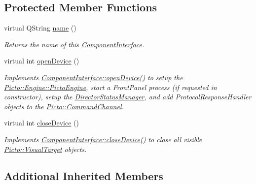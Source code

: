 \subsection*{Protected Member Functions}
\begin{DoxyCompactItemize}
\item 
\hypertarget{class_director_a757af6de79d8409b98d3d29db654ebf1}{virtual Q\-String \hyperlink{class_director_a757af6de79d8409b98d3d29db654ebf1}{name} ()}\label{class_director_a757af6de79d8409b98d3d29db654ebf1}

\begin{DoxyCompactList}\small\item\em Returns the name of this \hyperlink{class_component_interface}{Component\-Interface}. \end{DoxyCompactList}\item 
\hypertarget{class_director_aaa04b504d37eef09cbb636e118301a58}{virtual int \hyperlink{class_director_aaa04b504d37eef09cbb636e118301a58}{open\-Device} ()}\label{class_director_aaa04b504d37eef09cbb636e118301a58}

\begin{DoxyCompactList}\small\item\em Implements \hyperlink{class_component_interface_a93b77c54abbcd8ea42afb9fd204049bd}{Component\-Interface\-::open\-Device()} to setup the \hyperlink{class_picto_1_1_engine_1_1_picto_engine}{Picto\-::\-Engine\-::\-Picto\-Engine}, start a Front\-Panel process (if requested in constructor), setup the \hyperlink{class_director_status_manager}{Director\-Status\-Manager}, and add Protocol\-Response\-Handler objects to the \hyperlink{class_picto_1_1_command_channel}{Picto\-::\-Command\-Channel}. \end{DoxyCompactList}\item 
\hypertarget{class_director_afcbff5563cfc3e8577d8fb83023f543d}{virtual int \hyperlink{class_director_afcbff5563cfc3e8577d8fb83023f543d}{close\-Device} ()}\label{class_director_afcbff5563cfc3e8577d8fb83023f543d}

\begin{DoxyCompactList}\small\item\em Implements \hyperlink{class_component_interface_ab4433362fe7d1e5c09dc556e7105f775}{Component\-Interface\-::close\-Device()} to close all visible \hyperlink{class_picto_1_1_visual_target}{Picto\-::\-Visual\-Target} objects. \end{DoxyCompactList}\end{DoxyCompactItemize}
\subsection*{Additional Inherited Members}


